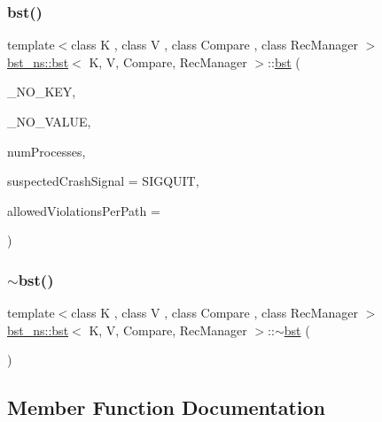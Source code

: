 \subsubsection{\texorpdfstring{bst()}{bst()}}
{\footnotesize\ttfamily template$<$class K , class V , class Compare , class Rec\+Manager $>$ \\
\hyperlink{classbst__ns_1_1bst}{bst\+\_\+ns\+::bst}$<$ K, V, Compare, Rec\+Manager $>$\+::\hyperlink{classbst__ns_1_1bst}{bst} (\begin{DoxyParamCaption}\item[{const K}]{\+\_\+\+N\+O\+\_\+\+K\+EY,  }\item[{const V}]{\+\_\+\+N\+O\+\_\+\+V\+A\+L\+UE,  }\item[{const int}]{num\+Processes,  }\item[{int}]{suspected\+Crash\+Signal = {\ttfamily SIGQUIT},  }\item[{int}]{allowed\+Violations\+Per\+Path = {} }\end{DoxyParamCaption})\hspace{0.3cm}{\ttfamily [inline]}}

\mbox{\label{classbst__ns_1_1bst_a4c894013d0092212d3f2bc2fb7eb8fb6}} 
\subsubsection{\texorpdfstring{$\sim$bst()}{~bst()}}
{\footnotesize\ttfamily template$<$class K , class V , class Compare , class Rec\+Manager $>$ \\
\hyperlink{classbst__ns_1_1bst}{bst\+\_\+ns\+::bst}$<$ K, V, Compare, Rec\+Manager $>$\+::$\sim$\hyperlink{classbst__ns_1_1bst}{bst} (\begin{DoxyParamCaption}{ }\end{DoxyParamCaption})\hspace{0.3cm}{\ttfamily [inline]}}



\subsection{Member Function Documentation}
\mbox{\label{classbst__ns_1_1bst_a794752307f06c0cdaa56dd7e30028bfa}} 
